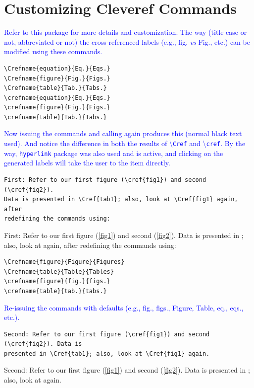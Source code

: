 \documentclass[phd,showframe]{ndsu-thesis-2022}
\newcommand\italk[1]{\textcolor{blue}{#1}}  %
\newcommand\cmd[1]{\textbackslash\texttt{#1}}  %
\begin{document}
\section{Customizing Cleveref Commands}
\italk{Refer to this package for more details and customization. The way (title case or not, abbreviated or not) the cross-referenced labels (e.g., fig. \emph{vs} Fig., etc.) can be modified using these commands. 
}

\begin{verbatim}
\Crefname{equation}{Eq.}{Eqs.}
\Crefname{figure}{Fig.}{Figs.}
\Crefname{table}{Tab.}{Tabs.}
\crefname{equation}{Eq.}{Eqs.}
\crefname{figure}{Fig.}{Figs.}
\crefname{table}{Tab.}{Tabs.}
\end{verbatim}

\italk{Now issuing the commands and calling again produces this (normal black text used). And notice the difference in both the results of \cmd{Cref} and \cmd{cref}. By the way, \texttt{hyperlink} package was also used and is active, and clicking on the generated labels will take the user to the item directly. }


{\singlespacing
\begin{verbatim}
First: Refer to our first figure (\cref{fig1}) and second (\cref{fig2}). 
Data is presented in \Cref{tab1}; also, look at \Cref{fig1} again, after 
redefining the commands using:
\end{verbatim}
}
First: Refer to our first figure (\cref{fig1}) and second (\cref{fig2}). Data is presented in ; also, look at  again, after redefining the commands using:

\begin{verbatim}
\Crefname{figure}{Figure}{Figures}
\Crefname{table}{Table}{Tables}
\crefname{figure}{fig.}{figs.}
\crefname{table}{tab.}{tabs.}
\end{verbatim}


\italk{Re-issuing the commands with defaults (e.g., fig., figs., Figure, Table, eq., eqs., etc.).}


{\singlespacing
\begin{verbatim}
Second: Refer to our first figure (\cref{fig1}) and second (\cref{fig2}). Data is 
presented in \Cref{tab1}; also, look at \Cref{fig1} again. 
\end{verbatim}
}
Second: Refer to our first figure (\cref{fig1}) and second (\cref{fig2}). Data is presented in ; also, look at  again. 
\end{document}
